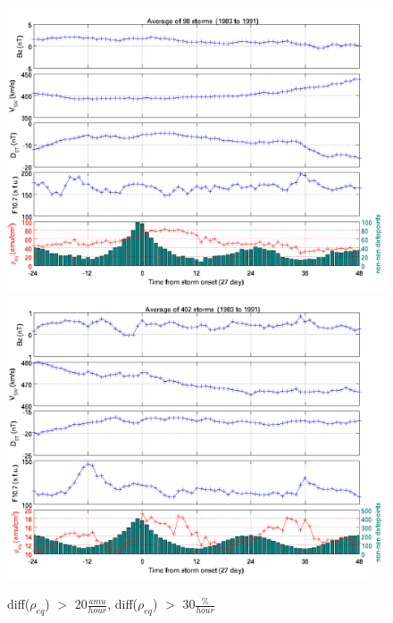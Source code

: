\documentclass[10pt,twocolumn]{article}
\begin{document}
\clearpage

\begin{figure}[htp!]
\centering
\includegraphics[scale=0.7]{paperfigures/stormavs-diffden-10amu.png}
\includegraphics[scale=0.7]{paperfigures/stormavs-diffden-30percent.png}
\caption{diff($\rho_{eq}$) $>$ 20$\frac{amu}{hour}$, diff($\rho_{eq}$) $>$ 30$\frac{\%}{hour}$}
\label{rhochange}
\end{figure}
\clearpage
\end{document}
